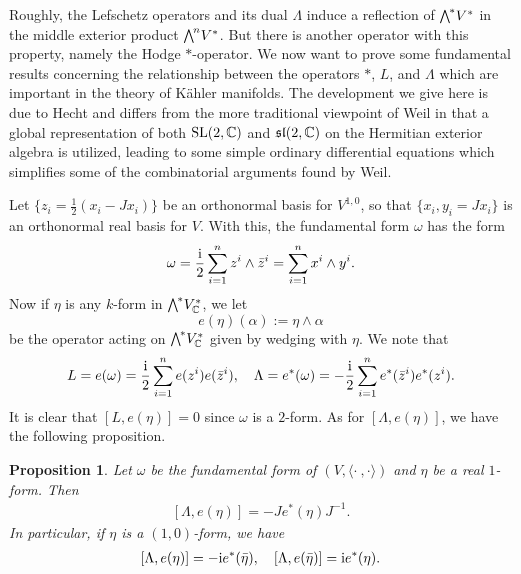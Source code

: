 \documentclass[11pt]{book}
\newtheorem{proposition}[theorem]{Proposition}
\theoremstyle{definition}
\begin{document}
Roughly, the Lefschetz operators and its dual $\Lambda$ induce a reflection of $\bigw^*V^*$ in the middle exterior product $\bigw^nV^*$. But there is another operator with this property, namely the Hodge $\ast$-operator. We now want to prove some fundamental results concerning the relationship between the operators $\ast$, $L$, and $\Lambda$ which are important in the theory of K\"ahler manifolds. The development we give here is due to Hecht and differs from the more traditional viewpoint of Weil in that a global representation of both $\mathrm{SL}(2,\mathbb{C})$ and $\mathfrak{sl}(2,\mathbb{C})$ on the Hermitian exterior algebra is utilized, leading to some simple ordinary differential equations which simplifies some of the combinatorial arguments found by Weil.\par
Let $\{z_i=\frac{1}{2}(x_i-Jx_i)\}$ be an orthonormal basis for $V^{1,0}$, so that $\{x_i,y_i=Jx_i\}$ is an orthonormal real basis for $V$. With this, the fundamental form $\omega$ has the form
\[\omega=\frac{\mathrm{i}}{2}\sum_{i=1}^{n}z^i\wedge\bar{z}^i=\sum_{i=1}^{n}x^i\wedge y^i.\]
Now if $\eta$ is any $k$-form in $\bigw^*V^*_{\C}$, we let
\[e(\eta)(\alpha):=\eta\wedge\alpha\]
be the operator acting on $\bigw^*V^*_{\C}$ given by wedging with $\eta$. We note that
\begin{align}\label{almost complex space interoir prod into L,Lambda}
L=e(\omega)=\frac{\mathrm{i}}{2}\sum_{i=1}^{n}e(z^i)e(\bar{z}^i),\quad \Lambda=e^*(\omega)=-\frac{\mathrm{i}}{2}\sum_{i=1}^{n}e^*(\bar{z}^i)e^*(z^i).
\end{align}
It is clear that $[L,e(\eta)]=0$ since $\omega$ is a $2$-form. As for $[\Lambda,e(\eta)]$, we have the following proposition.
\begin{proposition}\label{almost complex space interoir prod commutator with L,Lambda}
Let $\omega$ be the fundamental form of $(V,\langle\cdot\ ,\cdot\rangle)$ and $\eta$ be a real $1$-form. Then
\begin{align}\label{almost complex space interoir prod commutator with L,Lambda-2}
[\Lambda,e(\eta)]=-Je^*(\eta)J^{-1}.
\end{align}
In particular, if $\eta$ is a $(1,0)$-form, we have
\begin{align}\label{almost complex space interoir prod commutator with L,Lambda-1}
[\Lambda,e(\eta)]=-\mathrm{i} e^*(\bar{\eta}),\quad [\Lambda,e(\bar{\eta})]=\mathrm{i} e^*(\eta).
\end{align}
\end{proposition}
\end{document}

